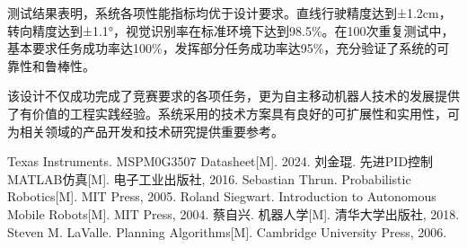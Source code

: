 \documentclass[UTF8]{ctexart}
\begin{document}
	\indent 测试结果表明，系统各项性能指标均优于设计要求。直线行驶精度达到±1.2cm，转向精度达到±1.1°，视觉识别率在标准环境下达到98.5\%。在100次重复测试中，基本要求任务成功率达100\%，发挥部分任务成功率达95\%，充分验证了系统的可靠性和鲁棒性。
	
	\indent 该设计不仅成功完成了竞赛要求的各项任务，更为自主移动机器人技术的发展提供了有价值的工程实践经验。系统采用的技术方案具有良好的可扩展性和实用性，可为相关领域的产品开发和技术研究提供重要参考。
	
	
	\begin{thebibliography}{99}
		 Texas Instruments. MSPM0G3507 Datasheet[M]. 2024.
		 刘金琨. 先进PID控制MATLAB仿真[M]. 电子工业出版社, 2016.
		 Sebastian Thrun. Probabilistic Robotics[M]. MIT Press, 2005.
		 Roland Siegwart. Introduction to Autonomous Mobile Robots[M]. MIT Press, 2004.
		 蔡自兴. 机器人学[M]. 清华大学出版社, 2018.
		 Steven M. LaValle. Planning Algorithms[M]. Cambridge University Press, 2006.
	\end{thebibliography}
	
	
\end{document}
